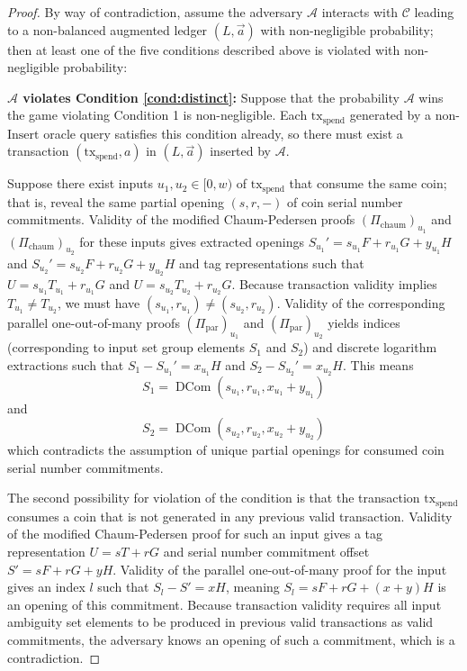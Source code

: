 \documentclass{llncs}
\newcommand{\dcom}{\operatorname{DCom}}
\begin{document}
\begin{proof}
By way of contradiction, assume the adversary $\mathcal{A}$ interacts with $\mathcal{C}$ leading to a non-balanced augmented ledger $(L, \vec{a})$ with non-negligible probability; then at least one of the five conditions described above is violated with non-negligible probability:

\textbf{$\mathcal{A}$ violates Condition \ref{cond:distinct}:} Suppose that the probability $\mathcal{A}$ wins the game violating Condition 1 is non-negligible.
Each $\text{tx}_{\text{spend}}$ generated by a non-$\text{Insert}$ oracle query satisfies this condition already, so there must exist a transaction $(\text{tx}_{\text{spend}}, a)$ in $(L, \vec{a})$ inserted by $\mathcal{A}$.

Suppose there exist inputs $u_1,u_2 \in [0,w)$ of $\text{tx}_{\text{spend}}$ that consume the same coin; that is, reveal the same partial opening $(s,r,-)$ of coin serial number commitments.
Validity of the modified Chaum-Pedersen proofs $(\Pi_{\text{chaum}})_{u_1}$ and $(\Pi_{\text{chaum}})_{u_2}$ for these inputs gives extracted openings $S_{u_1}' = s_{u_1} F + r_{u_1} G + y_{u_1} H$ and $S_{u_2}' = s_{u_2} F + r_{u_2} G + y_{u_2} H$ and tag representations such that $U = s_{u_1} T_{u_1} + r_{u_1} G$ and $U = s_{u_2} T_{u_2} + r_{u_2} G$.
Because transaction validity implies $T_{u_1} \neq T_{u_2}$, we must have $(s_{u_1},r_{u_1}) \neq (s_{u_2},r_{u_2})$.
Validity of the corresponding parallel one-out-of-many proofs $(\Pi_{\text{par}})_{u_1}$ and $(\Pi_{\text{par}})_{u_2}$ yields indices (corresponding to input set group elements $S_1$ and $S_2$) and discrete logarithm extractions such that $S_1 - S_{u_1}' = x_{u_1} H$ and $S_2 - S_{u_2}' = x_{u_2} H$.
This means
$$S_1 = \dcom(s_{u_1},r_{u_1},x_{u_1}+y_{u_1})$$
and
$$S_2 = \dcom(s_{u_2},r_{u_2},x_{u_2}+y_{u_2})$$
which contradicts the assumption of unique partial openings for consumed coin serial number commitments.

The second possibility for violation of the condition is that the transaction $\text{tx}_{\text{spend}}$ consumes a coin that is not generated in any previous valid transaction.
Validity of the modified Chaum-Pedersen proof for such an input gives a tag representation $U = sT + rG$ and serial number commitment offset $S' = sF + rG + yH$.
Validity of the parallel one-out-of-many proof for the input gives an index $l$ such that $S_l - S' = xH$, meaning $S_l = sF + rG + (x + y)H$ is an opening of this commitment.
Because transaction validity requires all input ambiguity set elements to be produced in previous valid transactions as valid commitments, the adversary knows an opening of such a commitment, which is a contradiction.


\end{proof}
\end{document}
